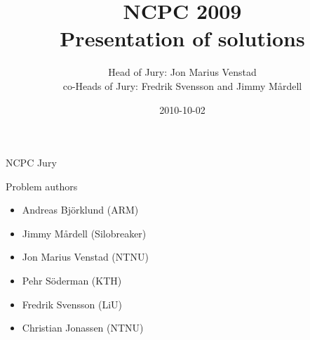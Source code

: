 \documentclass[screen]{beamer}
\title[NCPC 2010 solutions]{NCPC 2009\\Presentation of solutions}
\author[]{Head of Jury: Jon Marius Venstad\\co-Heads of Jury: Fredrik Svensson and Jimmy M{\aa}rdell}
\institute[]{}
\date{2010-10-02}
\begin{document}
\renewcommand{\insertshortauthor}{}
\titlepage

\renewcommand{\insertshortauthor}{}
\begin{frame}{NCPC Jury}
  \begin{block}{Problem authors}
    \begin{itemize}
      \item Andreas Bj\"orklund (ARM)
      \item Jimmy M{\aa}rdell (Silobreaker)
      \item Jon Marius Venstad (NTNU)
      \item Pehr S\"oderman (KTH)
      \item Fredrik Svensson (LiU)
      \item Christian Jonassen (NTNU)
    \end{itemize}
  \end{block}
\end{frame}

\newcommand{\slid}[1]{}



\slid{succession}		%
\slid{connect}			%
\slid{borg}				%
\slid{driving}			%
\slid{doodle}			%
\slid{add-help}			%
\slid{gameshow}			%
\slid{polyomino}		%
\slid{statisticians}	%
\slid{skyline}			%
\slid{roundtrip}		%
\end{document}
